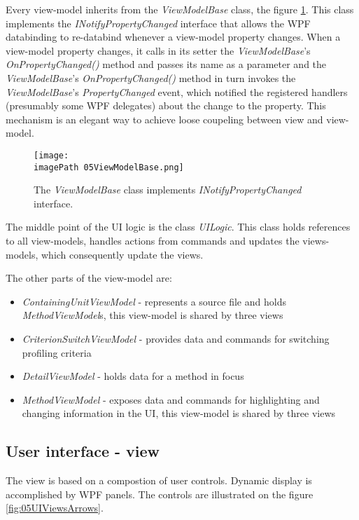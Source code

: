 Every view-model inherits from the \textit{ViewModelBase} class, the figure \ref{fig:05ViewModelBase}. This class implements the \textit{INotifyPropertyChanged} interface that allows the WPF databinding to re-databind whenever a view-model property changes. When a view-model property changes, it calls in its setter the \textit{ViewModelBase}'s \textit{OnPropertyChanged()} method and passes its name as a parameter and the \textit{ViewModelBase}'s \textit{OnPropertyChanged()} method in turn invokes the \textit{ViewModelBase}'s \textit{PropertyChanged} event, which notified the registered handlers (presumably some WPF delegates) about the change to the property. This mechanism is an elegant way to achieve loose coupeling between view and view-model.
 
 \begin{figure}
	\centering
		\texttt{[image: \\imagePath 05ViewModelBase.png]}
		\caption{The \textit{ViewModelBase} class implements \textit{INotifyPropertyChanged} interface.}
	\label{fig:05ViewModelBase}
\end{figure}

The middle point of the UI logic is the class \textit{UILogic}. This class holds references to all view-models, handles actions from commands and updates the views-models, which consequently update the views.

The other parts of the view-model are:

\begin{itemize}	
\item  \textit{ContainingUnitViewModel} - represents a source file and holds \textit{MethodViewModel}s, this view-model is shared by three views	

\item \textit{CriterionSwitchViewModel} - provides data and commands for switching profiling criteria

\item \textit{DetailViewModel} - holds data for a method in focus

\item \textit{MethodViewModel} - exposes data and commands for highlighting and changing information in the UI, this view-model is shared by three views	
\end{itemize}


\subsection{User interface - view}
The view is based on a compostion of user controls. Dynamic display is accomplished by WPF panels. The controls are illustrated on the figure \ref{fig:05UIViewsArrows}.

